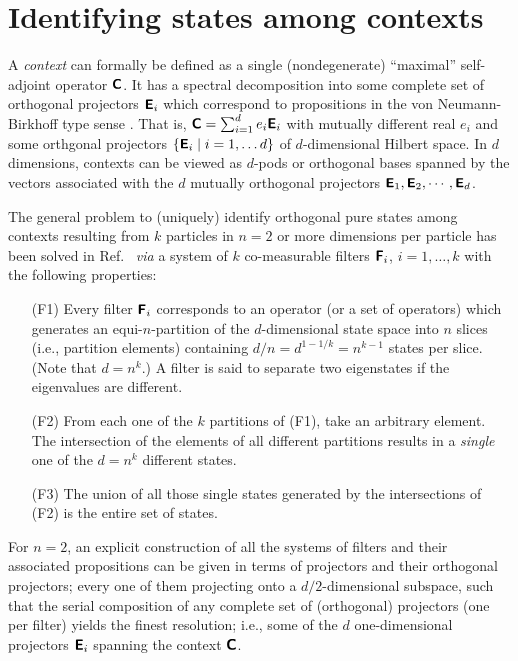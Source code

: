 \section{Identifying states among contexts}

A {\em context} can formally be defined \cite{svozil-2004-vax}
as a single (nondegenerate) ``maximal'' self-adjoint operator
$\textsf{\textbf{C}}$.
It has a spectral
decomposition into some complete set of orthogonal projectors $\textsf{\textbf{E}}_i$
which correspond to propositions in
the von Neumann-Birkhoff type sense \cite{birkhoff-36,v-neumann-49}.
That is, $\textsf{\textbf{C}}=\sum_{i=1}^d e_i \textsf{\textbf{E}}_i$
with mutually different real $e_i$ and some orthgonal projectors
$\{\textsf{\textbf{E}}_i{} \mid i=1,\ldots d\}$ of
$d$-dimensional Hilbert space.
In $d$ dimensions, contexts can be viewed as $d$-pods or orthogonal bases
spanned by the vectors associated with the $d$ mutually orthogonal projectors
$\textsf{\textbf{E}}_1,
\textsf{\textbf{E}}_2, \cdots, \textsf{\textbf{E}}_d$.

The general problem to (uniquely) identify orthogonal pure states
among contexts resulting from $k$ particles in $n=2$ or more dimensions per particle
has been solved in Ref.~\cite{DonSvo01,svozil-2002-statepart-prl,svozil-2003-garda}
{\em via} a system of $k$ co-measurable  filters $\textsf{\textbf{F}}_i$, $i=1,\ldots, k$
with the following properties:
\begin{enumerate}
\item[(F1)]
Every filter $\textsf{\textbf{F}}_i$
corresponds to an operator (or a set of operators)
which generates an
equi-$n$-partition of the $d$-dimensional state space into
$n$ slices (i.e., partition elements) containing $d/n=d^{1-1/k}=n^{k-1}$ states per slice.
(Note that $d=n^k$.)
A filter is said to separate two eigenstates if the eigenvalues are different.
\item[(F2)]
From each one of the $k$ partitions of (F1), take an arbitrary element.
The intersection of the elements of all different partitions
results in a {\it single} one of the $d=n^k$ different states.
\item[(F3)]
The union of all those single states generated by the intersections of (F2)
is the entire set of states.
\end{enumerate}

For $n=2$, an explicit construction of all the systems of filters and their associated propositions
can be given in terms of projectors and their orthogonal projectors;
every one of them projecting onto a $d/2$-dimensional subspace,
such that the serial composition of any complete set of (orthogonal) projectors (one per filter)
yields the finest resolution; i.e., some of the $d$ one-dimensional projectors $\textsf{\textbf{E}}_i$
spanning the context $\textsf{\textbf{C}}$.

